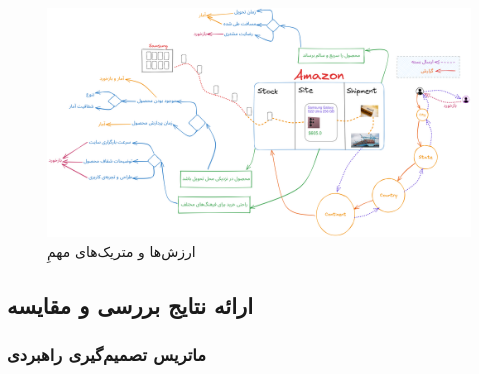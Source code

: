 \documentclass[12pt, dvipsnames, svgnames, x11names,]{article}
\begin{document}
\begin{itemize}
\begin{figure}[b]
    \begin{center}
        \includegraphics[width=0.95\textheight, height=0.95\textwidth, angle=90]{../images/amazon-comp(2)}
    \end{center}
\caption{ارزش‌ها و متریک‌های مهمِ }\label{amz-comp}
\end{figure}
\end{itemize}

\subsection{ارائه نتایج بررسی و مقایسه}
\subsubsection{ماتریس تصمیم‌گیری راهبردی}
\end{document}
